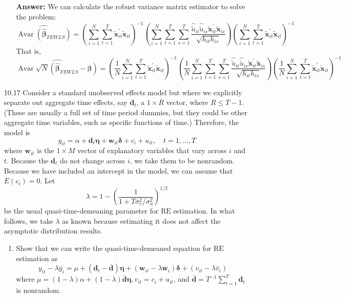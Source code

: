 \begin{enumerate}
\begin{enumerate}
        \textbf{Answer:} We can calculate the robust variance matrix estimator to solve the problem:
        \[ \widehat{\operatorname{Avar} \left( \hat{\bm{\beta}}_{FEWLS} \right)} = \left( \sum_{i=1}^N\sum_{t=1}^{T} \tilde{\mathbf{x}}_{i t}^{\prime} \tilde{\mathbf{x}}_{i t} \right)^{-1} \left( \sum_{i=1}^N\sum_{t=1}^T\sum_{s=1}^T \frac{ \hat{\tilde{u}}_{it} \hat{\tilde{u}}_{is} \tilde{\mathbf{x}}_{it}^{\prime} \tilde{\mathbf{x}}_{is} }{ \sqrt{h_{it} h_{is}} } \right) \left( \sum_{i=1}^N\sum_{t=1}^{T} \tilde{\mathbf{x}}_{i t}^{\prime} \tilde{\mathbf{x}}_{i t} \right)^{-1} \]
        That is, 
        \[ \widehat{\operatorname{Avar}\sqrt{N}\left(\hat{\boldsymbol{\beta}}_{FEWLS}-\boldsymbol{\beta}\right)} = \left( \frac{1}{N} \sum_{i=1}^N\sum_{t=1}^{T} \tilde{\mathbf{x}}_{i t}^{\prime} \tilde{\mathbf{x}}_{i t} \right)^{-1} \left( \frac{1}{N} \sum_{i=1}^N\sum_{t=1}^T\sum_{s=1}^T \frac{ \hat{\tilde{u}}_{it} \hat{\tilde{u}}_{is} \tilde{\mathbf{x}}_{it}^{\prime} \tilde{\mathbf{x}}_{is} }{ \sqrt{h_{it} h_{is}} } \right) \left( \frac{1}{N} \sum_{i=1}^N\sum_{t=1}^{T} \tilde{\mathbf{x}}_{i t}^{\prime} \tilde{\mathbf{x}}_{i t} \right)^{-1} \]
    \end{enumerate}
    
    
    \item[10.17] Consider a standard unobserved effects model but where we explicitly separate out aggregate time effects, say $\mathbf{d}_{t}$, a $1 \times R$ vector, where $R \leq T-1$. (These are usually a full set of time period dummies, but they could be other aggregate time variables, such as specific functions of time.) Therefore, the model is
    \[ y_{i t}=\alpha+\mathbf{d}_{t} \boldsymbol{\eta}+\mathbf{w}_{i t} \boldsymbol{\delta}+c_{i}+u_{i t}, \quad t=1, \ldots, T \]
    where $\mathbf{w}_{i t}$ is the $1 \times M$ vector of explanatory variables that vary across $i$ and $t$. Because the $\mathbf{d}_{t}$ do not change across $i$, we take them to be nonrandom. Because we have included an intercept in the model, we can assume that $E\left(c_{i}\right)=0 .$ Let 
    \[ \lambda = 1 - \left( \frac{1}{\displaystyle 1 + T \sigma_c^2 / \sigma_u^2} \right)^{1/2} \]
    be the usual quasi-time-demeaning parameter for $\mathrm{RE}$ estimation. In what follows, we take $\lambda$ as known because estimating it does not affect the asymptotic distribution results.
    
    \begin{enumerate}
        \item Show that we can write the quasi-time-demeaned equation for $\mathrm{RE}$ estimation as
        \[ y_{it}-\lambda \bar{y}_{i}=\mu+\left(\mathbf{d}_{t}-\bar{\mathbf{d}}\right) \boldsymbol{\eta}+\left(\mathbf{w}_{i t}-\lambda \overline{\mathbf{w}}_{i}\right) \boldsymbol{\delta}+\left(v_{i t}-\lambda \bar{v}_{i}\right) \]
        where $\mu=(1-\lambda) \alpha+(1-\lambda) \bar{\mathbf{d}} \boldsymbol{\eta}, v_{i t}=c_{i}+u_{i t}$, and $\bar{\mathbf{d}}=T^{-1} \sum_{t=1}^{T} \mathbf{d}_{t}$ is nonrandom.
        

\end{enumerate}
\end{enumerate}
